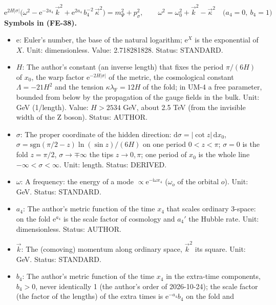 \documentclass[
  10pt,
]{article}
\providecommand{\tightlist}{%
  \setlength{\itemsep}{0pt}\setlength{\parskip}{0pt}}
\begin{document}
\[
\mathrm{e}^{2H\lvert\sigma\rvert}\Big(\omega^2 - \mathrm{e}^{-2a_4}\,\vec k^2 + \mathrm{e}^{2a_4}\,b_4^{-2}\,\vec\kappa^2\Big) = m_\Psi^2 + p_\sigma^2,\qquad
\omega^2 = \omega_0^2 + \vec k^2 - \vec\kappa^2\quad\big(a_4 = 0,\ b_4 = 1\big) \tag{FE-38}
\] \textbf{Symbols in (FE-38).}

\begin{itemize}
\tightlist
\item
  \(\mathrm{e}\): Euler's number, the base of the natural logarithm;
  \(\mathrm{e}^{X}\) is the exponential of \(X\). Unit: dimensionless.
  Value: 2.718281828. Status: STANDARD.
\item
  \(H\): The author's constant (an inverse length) that fixes the period
  \(\pi/(6H)\) of \(x_0\), the warp factor
  \(\mathrm{e}^{-2H\lvert\sigma\rvert}\) of the metric, the cosmological
  constant \(\Lambda = -21H^2\) and the tension
  \(\kappa\lambda_{\mathrm{F}} = 12H\) of the fold; in UM-4 a free
  parameter, bounded from below by the propagation of the gauge fields
  in the bulk. Unit: GeV (1/length). Value: \(H > 2534\) GeV, about 2.5
  TeV (from the invisible width of the Z boson). Status: AUTHOR.
\item
  \(\sigma\): The proper coordinate of the hidden direction:
  \(\mathrm{d}\sigma = \lvert\cot z\rvert\,\mathrm{d}x_0\),
  \(\sigma = \mathrm{sgn}(\pi/2 - z)\ln(\sin z)/(6H)\) on one period
  \(0 < z < \pi\); \(\sigma = 0\) is the fold \(z = \pi/2\),
  \(\sigma \to \mp\infty\) the tips \(z \to 0, \pi\); one period of
  \(x_0\) is the whole line \(-\infty < \sigma < \infty\). Unit: length.
  Status: DERIVED.
\item
  \(\omega\): A frequency: the energy of a mode
  \(\propto \mathrm{e}^{-\mathrm{i}\omega x_4}\) (\(\omega_o\) of the
  orbital \(o\)). Unit: GeV. Status: STANDARD.
\item
  \(a_4\): The author's metric function of the time \(x_4\) that scales
  ordinary 3-space: on the fold \(\mathrm{e}^{a_4}\) is the scale factor
  of cosmology and \(a_4'\) the Hubble rate. Unit: dimensionless.
  Status: AUTHOR.
\item
  \(\vec k\): The (comoving) momentum along ordinary space, \(\vec k^2\)
  its square. Unit: GeV. Status: STANDARD.
\item
  \(b_4\): The author's metric function of the time \(x_4\) in the
  extra-time components, \(b_4 > 0\), never identically 1 (the author's
  order of 2026-10-24); the scale factor (the factor of the lengths) of
  the extra times is \(\mathrm{e}^{-a_4}b_4\) on the fold and

\end{itemize}
\end{document}
